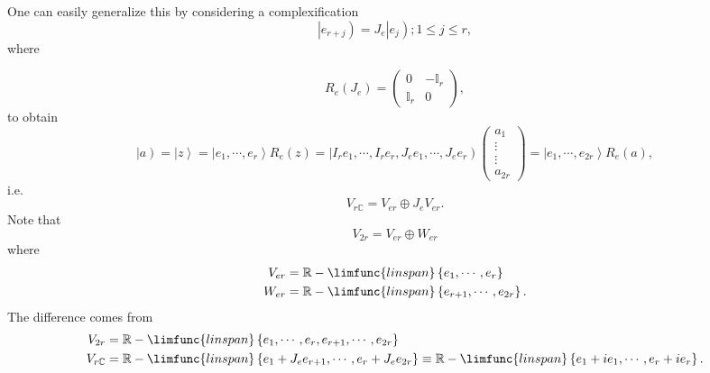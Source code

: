 \documentclass[aps,preprint]{revtex4}
\begin{document}
One can easily generalize this by considering a complexification 
\begin{equation}
\left\vert e_{r+j}\right) =J_{e}\left\vert e_{j}\right) ;1\leq j\leq r,
\end{equation}
where

\begin{equation}
R_{e}\left( J_{e}\right) =\left( 
\begin{array}{cc}
0 & -\mathbb{I}_{r} \\ 
\mathbb{I}_{r} & 0%
\end{array}
\right) ,
\end{equation}
to obtain 
\begin{equation}
\left\vert a\right) =\left\vert z\right\rangle =\left\vert e_{1},\cdots
,e_{r}\right\rangle R_{e}\left( z\right) =\left\vert I_{r}e_{1},\cdots
,I_{r}e_{r},J_{e}e_{1},\cdots,J_{e}e_{r}\right) \left( 
\begin{array}{c}
a_{1} \\ 
\vdots \\ 
\vdots \\ 
a_{2r}%
\end{array}
\right) =\left\vert e_{1},\cdots,e_{2r}\right\rangle R_{e}\left( a\right) ,
\end{equation}
i.e. 
\begin{equation}
V_{r\mathbb{C}}=V_{er}\oplus J_{e}V_{er}.
\end{equation}
Note that 
\begin{equation}
V_{2r}=V_{er}\oplus W_{er}
\end{equation}
where 
\begin{align}
V_{er} & =\mathbb{R}-\limfunc{linspan}\left\{ e_{1},\cdots ,e_{r}\right\} \\
W_{er} & =\mathbb{R}-\limfunc{linspan}\left\{ e_{r+1},\cdots ,e_{2r}\right\}
.
\end{align}
The difference comes from 
\begin{align}
V_{2r} & =\mathbb{R}-\limfunc{linspan}\left\{ e_{1},\cdots
,e_{r},e_{r+1},\cdots,e_{2r}\right\} \\
V_{r\mathbb{C}} & =\mathbb{R}-\limfunc{linspan}\left\{
e_{1}+J_{e}e_{r+1},\cdots,e_{r}+J_{e}e_{2r}\right\} \equiv\mathbb{R}-%
\limfunc{linspan}\left\{ e_{1}+ie_{1},\cdots,e_{r}+ie_{r}\right\} .
\end{align}
\end{document}
